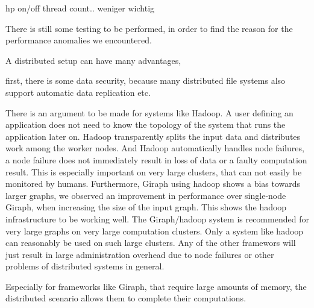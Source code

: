 hp on/off
thread count.. weniger wichtig











There is still some testing to be performed, in order to find the reason for the performance anomalies we encountered. 




A distributed setup can have many advantages,


first, there is some data security, because many distributed file systems also support automatic data replication etc.



There is an argument to be made for systems like Hadoop.
A user defining an application does not need to know the topology of the system that runs the application later on.
Hadoop transparently splits the input data and distributes work among the worker nodes.
And Hadoop automatically handles node failures, a node failure does not immediately result in loss of data or a faulty computation result.
This is especially important on very large clusters, that can not easily be monitored by humans.
Furthermore, Giraph using hadoop shows a bias towards larger graphs, we observed an improvement in performance over single-node Giraph, when increasing the size of the input graph.
This shows the hadoop infrastructure to be working well. 
The Giraph/hadoop system is recommended for very large graphs on very large computation clusters.
Only a system like hadoop can reasonably be used on such large clusters.
Any of the other framewors will just result in large administration overhead due to node failures or other problems of distributed systems in general.




Especially for frameworks like Giraph, that require large amounts of memory, the distributed scenario allows them to complete their computations. 


